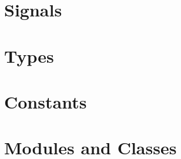     

  \section{Signals}

  \section{Types}

  \section{Constants}

  \section{Modules and Classes}